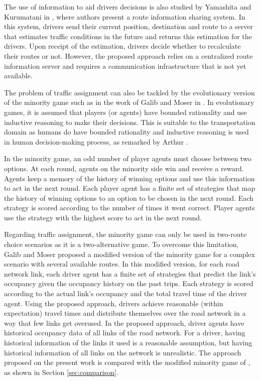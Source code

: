 \documentclass{RITA}
\begin{document}
The use of information to aid drivers decisions is also studied by Yamashita and Kurumatani in \cite{Yamashita&Kurumatani2009}, where authors present a route information sharing system. In this system, drivers send their current position, destination and route to a server that estimates traffic conditions in the future and returns this estimation for the drivers. Upon receipt of the estimation, drivers decide whether to recalculate their routes or not. However, the proposed approach relies on a centralized route information server and requires a communication infrastructure that is not yet available.

The problem of traffic assignment can also be tackled by the evolutionary version of the minority game \cite{Challet&Zhang1997} such as in the work of Galib and Moser in \cite{Galib&Moser2011}. In evolutionary games, it is assumed that players (or agents) have bounded rationality and use inductive reasoning to make their decisions. This is suitable to the transportation domain as humans do have bounded rationality and inductive reasoning is used in human decision-making process, as remarked by Arthur \cite{Arthur1994}.

In the minority game, an odd number of player agents must choose between two options. At each round, agents on the minority side win and receive a reward. Agents keep a memory of the history of winning options and use this information to act in the next round. Each player agent has a finite set of strategies that map the history of winning options to an option to be chosen in the next round. Each strategy is scored according to the number of times it went correct. Player agents use the strategy with the highest score to act in the next round.

Regarding traffic assignment, the minority game can only be used in two-route choice scenarios as it is a two-alternative game. To overcome this limitation, Galib and Moser \cite{Galib&Moser2011} proposed a modified version of the minority game for a complex scenario with several available routes. In this modified version, for each road network link, each driver agent has a finite set of strategies that predict the link's occupancy given the occupancy history on the past trips. Each strategy is scored according to the actual link's occupancy and the total travel time of the driver agent. Using the proposed approach, drivers achieve reasonable (within expectation) travel times and distribute themselves over the road network in a way that few links get overused. In the proposed approach, driver agents have historical occupancy data of all links of the road network. For a driver, having historical information of the links it used is a reasonable assumption, but having historical information of all links on the network is unrealistic. The approach proposed on the present work is compared with the modified minority game of \cite{Galib&Moser2011}, as shown in Section \ref{sec:comparison}. 
\end{document}
